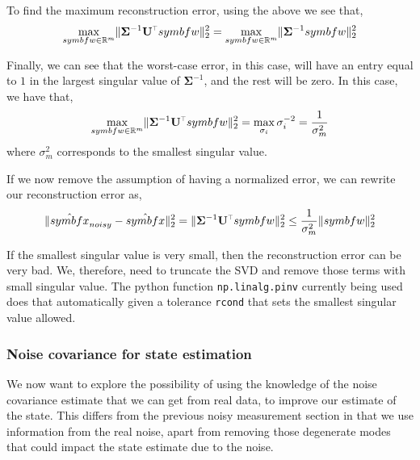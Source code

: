 \documentclass[SE,authoryear,toc]{lsstdoc}
\renewcommand{\v}[1]{\mathbf{#1}}
\newcommand{\tr}{\scalebox{0.6}{$\top$}}
\DeclarePairedDelimiter{\norm}{\lVert}{\rVert}
\begin{document}
To find the maximum reconstruction error, using the above we see that, 
\begin{equation}
    \max_{\\symbf{w} \in \mathbb{R}^m} \norm{\v{\Sigma}^{-1}\v{U}^{\tr}\\symbf{w} }_2^2 = \max_{\\symbf{w} \in \mathbb{R}^m} \norm{\v{\Sigma}^{-1}\\symbf{w} }_2^2
\end{equation}

Finally, we can see that the worst-case error, in this case, will have an entry equal to $1$ in the largest singular value of $\v{\Sigma}^{-1}$, and the rest will be zero. In this case, we have that,
\begin{equation}
    \max_{\\symbf{w} \in \mathbb{R}^m} \norm{\v{\Sigma}^{-1}\v{U}^{\tr}\\symbf{w} }_2^2 = \max_{\sigma_i} \sigma_i^{-2} = \frac{1}{\sigma_m^2}
\end{equation}
where $\sigma_m^2$ corresponds to the smallest singular value. 

If we now remove the assumption of having a normalized error, we can rewrite our reconstruction error as, 
\begin{equation}
    \norm{\hat{\\symbf{x}}_{noisy} - \hat{\\symbf{x}}}_2^2 = \norm{\v{\Sigma}^{-1}\v{U}^{\tr}\\symbf{w} }_2^2 \leq  \frac{1}{\sigma_m^2} \norm{\\symbf{w}}^2_2
\end{equation}

If the smallest singular value is very small, then the reconstruction error can be very bad. We, therefore, need to truncate the SVD and remove those terms with small singular value. The python function \texttt{np.linalg.pinv} currently being used does that automatically given a tolerance \texttt{rcond} that sets the smallest singular value allowed.
\subsubsection*{Noise covariance for state estimation}
We now want to explore the possibility of using the knowledge of the noise covariance estimate that we can get from real data, to improve our estimate of the state. This differs from the previous noisy measurement section in that we use information from the real noise, apart from removing those degenerate modes that could impact the state estimate due to the noise. 
\end{document}
